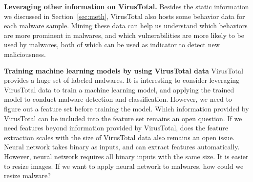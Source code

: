 {\bf Leveraging other information on VirusTotal.}
Besides the static information we discussed in Section~\ref{sec:meth}, 
VirusTotal also hosts some behavior data for each malware sample. 
Mining these data can help us understand which behaviors are more prominent in malwares, 
and which vulnerabilities are more likely to be used by malwares, both of which can be used as indicator to detect new maliciousness. 

{\bf Training machine learning models by using VirusTotal data}
VirusTotal provides a huge set of labeled malwares. 
It is interesting to consider leveraging VirusTotal data to train a machine learning model, and applying the trained model to conduct malware detection and classification. 
However, we need to figure out a feature set before training the model. 
Which information provided by VirusTotal can be included into the feature set remains an open question. If we need features beyond information provided by VirusTotal, does the feature extraction scales with the size of VirusTotal data also remains an open issue. 
Neural network takes binary as inputs, and can extract features automatically. 
However, neural network requires all binary inputs with the same size. It is easier to resize images. If we want to apply neural network to malwares, how could we resize malware? 

